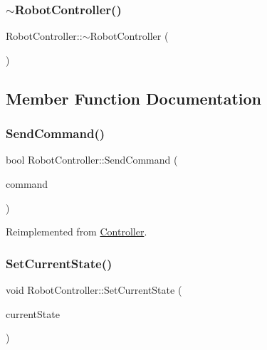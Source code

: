 \subsubsection{\texorpdfstring{$\sim$RobotController()}{~RobotController()}}
{\footnotesize\ttfamily Robot\+Controller\+::$\sim$\+Robot\+Controller (\begin{DoxyParamCaption}{ }\end{DoxyParamCaption})}



\subsection{Member Function Documentation}
\mbox{\label{class_robot_controller_a0eaac3943f32b7bdab6d5af94bf7af36}} 
\subsubsection{\texorpdfstring{SendCommand()}{SendCommand()}}
{\footnotesize\ttfamily bool Robot\+Controller\+::\+Send\+Command (\begin{DoxyParamCaption}\item[{\mbox{\hyperlink{_commands_8h_a16664d91c016c57e51eff6cbd28e32cf}{Command}}}]{command }\end{DoxyParamCaption})\hspace{0.3cm}{\ttfamily [virtual]}}



Reimplemented from \mbox{\hyperlink{class_controller_a61906c4d57c4807205aac20ce6e34ea3}{Controller}}.

\mbox{\label{class_robot_controller_a71bdb3a9c4bfa5bbdbdedcc3f0d3d8af}} 
\subsubsection{\texorpdfstring{SetCurrentState()}{SetCurrentState()}}
{\footnotesize\ttfamily void Robot\+Controller\+::\+Set\+Current\+State (\begin{DoxyParamCaption}\item[{std\+::unique\+\_\+ptr$<$ \mbox{\hyperlink{class_robot_state}{Robot\+State}} $>$}]{current\+State }\end{DoxyParamCaption})\hspace{0.3cm}{\ttfamily [virtual]}}



